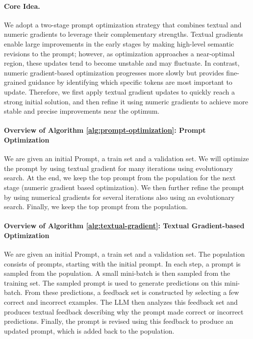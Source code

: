 \documentclass[12pt]{article}
\begin{document}
\paragraph{Core Idea.} We adopt a two-stage prompt optimization strategy that combines textual and numeric gradients to leverage their complementary strengths. 
Textual gradients enable large improvements in the early stages by making high-level semantic revisions to the prompt; 
however, as optimization approaches a near-optimal region, these updates tend to become unstable and may fluctuate. 
In contrast, numeric gradient-based optimization progresses more slowly but provides fine-grained guidance by identifying which specific tokens are most important to update. 
Therefore, we first apply textual gradient updates to quickly reach a strong initial solution, 
and then refine it using numeric gradients to achieve more stable and precise improvements near the optimum.

\paragraph{Overview of Algorithm \ref{alg:prompt-optimization}: Prompt Optimization} We are given an initial Prompt, a train set and a validation set.
We will optimize the prompt by using textual gradient for many iterations using evolutionary search.
At the end, we keep the top prompt from the population for the next stage (numeric gradient based optimization).
We then further refine the prompt by using numerical gradients for several iterations also using an evolutionary search.
Finally, we keep the top prompt from the population.

\paragraph{Overview of Algorithm \ref{alg:textual-gradient}: Textual Gradient-based Optimization}
We are given an initial Prompt, a train set and a validation set.
The population consists of prompts, starting with the initial prompt.
In each step, a prompt is sampled from the population.
A small mini-batch is then sampled from the training set.
The sampled prompt is used to generate predictions on this mini-batch.
From these predictions, a feedback set is constructed by selecting a few correct and incorrect examples.
The LLM then analyzes this feedback set and produces textual feedback describing why the prompt made correct or incorrect predictions.
Finally, the prompt is revised using this feedback to produce an updated prompt, which is added back to the population.
\end{document}
